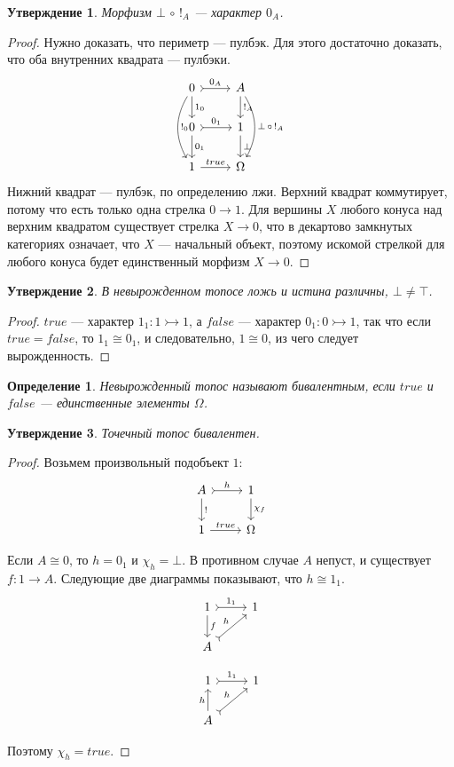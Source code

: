 \documentclass[a4paper, 12pt]{article}
\newtheorem{definition}{Определение}
\newtheorem{exercise}{Утверждение}
\begin{document}
\begin{exercise}
Морфизм $\bot\,\circ\,!_A$ --- характер $0_A$.
\end{exercise}
\begin{proof} Нужно доказать, что периметр --- пулбэк. Для этого достаточно доказать, что оба внутренних квадрата --- пулбэки.
\[
\begin{tikzcd}
0 \arrow{d}{1_0}
\arrow[bend right=30]{dd}{!_0} \arrow[tail]{r}{0_A}
& A \arrow{d}{!_A}
\arrow[bend left=30]{dd}{\bot\,\circ\,!_A} \\
0 \arrow[tail]{r}{0_1} \arrow{d}{0_1} & 1 \arrow{d}{\bot} \\
1 \arrow{r}{true}
& \Omega
\end{tikzcd}
\]
Нижний квадрат --- пулбэк, по определению лжи. Верхний квадрат коммутирует, потому что есть только одна стрелка $0\to 1$. Для вершины $X$ любого конуса над верхним квадратом существует стрелка $X\to 0$, что в декартово замкнутых категориях означает, что $X$ --- начальный объект, поэтому искомой стрелкой для любого конуса будет единственный морфизм $X\to 0$.\end{proof}

\begin{exercise}
В невырожденном топосе ложь и истина различны, $\bot\ne\top$.
\end{exercise} 
\begin{proof}
$true$ --- характер $1_1\colon 1\rightarrowtail 1$, а $false$ --- характер $0_1\colon 0\rightarrowtail 1$, так что если $true = false$, то $1_1\cong 0_1$, и следовательно, $1\cong 0$, из чего следует вырожденность.
\end{proof}

\begin{definition}
Невырожденный топос называют бивалентным, если $true$ и $false$ --- единственные элементы $\Omega$. 
\end{definition}

\begin{exercise}
Точечный топос бивалентен.
\end{exercise} 
\begin{proof}
Возьмем произвольный подобъект $1$:
\[
\begin{tikzcd}
A \arrow{d}{!} \arrow[tail]{r}{h}
& 1 \arrow{d}{\chi_f} \\
1 \arrow{r}{true}
& \Omega
\end{tikzcd}
\]

Если $A\cong 0$, то $h=0_1$ и $\chi_h=\bot$.
В противном случае $A$ непуст, и существует $f\colon 1\to A$.
Следующие две диаграммы показывают, что $h\cong 1_1$.
\[
\begin{tikzcd}
1 \arrow[tail]{r}{1_1} \arrow{d}{f}
& 1 \\
A \arrow[tail]{ur}{h} 
\end{tikzcd}
\]

\[
\begin{tikzcd}
1 \arrow[tail]{r}{1_1} 
& 1 \\
A \arrow{u}{h} \arrow[tail]{ur}{h} 
\end{tikzcd}
\]

Поэтому $\chi_h = true$.
\end{proof}
\end{document}
